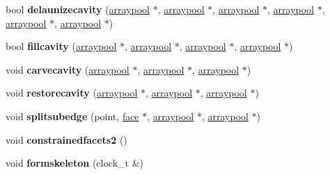 \begin{DoxyCompactItemize}
\item 
\hypertarget{classtetgenmesh_ad8084ebb402b7a0d06303eda20ecae65}{bool {\bfseries delaunizecavity} (\hyperlink{classtetgenmesh_1_1arraypool}{arraypool} $\ast$, \hyperlink{classtetgenmesh_1_1arraypool}{arraypool} $\ast$, \hyperlink{classtetgenmesh_1_1arraypool}{arraypool} $\ast$, \hyperlink{classtetgenmesh_1_1arraypool}{arraypool} $\ast$, \hyperlink{classtetgenmesh_1_1arraypool}{arraypool} $\ast$, \hyperlink{classtetgenmesh_1_1arraypool}{arraypool} $\ast$)}\label{classtetgenmesh_ad8084ebb402b7a0d06303eda20ecae65}

\item 
\hypertarget{classtetgenmesh_a03633c0bdf34efd2fe127d7c07060af8}{bool {\bfseries fillcavity} (\hyperlink{classtetgenmesh_1_1arraypool}{arraypool} $\ast$, \hyperlink{classtetgenmesh_1_1arraypool}{arraypool} $\ast$, \hyperlink{classtetgenmesh_1_1arraypool}{arraypool} $\ast$, \hyperlink{classtetgenmesh_1_1arraypool}{arraypool} $\ast$)}\label{classtetgenmesh_a03633c0bdf34efd2fe127d7c07060af8}

\item 
\hypertarget{classtetgenmesh_a820c230ca5161419ee7d1d9a731a17af}{void {\bfseries carvecavity} (\hyperlink{classtetgenmesh_1_1arraypool}{arraypool} $\ast$, \hyperlink{classtetgenmesh_1_1arraypool}{arraypool} $\ast$, \hyperlink{classtetgenmesh_1_1arraypool}{arraypool} $\ast$)}\label{classtetgenmesh_a820c230ca5161419ee7d1d9a731a17af}

\item 
\hypertarget{classtetgenmesh_aa1697de5ddb0d46c145da0b7da97281c}{void {\bfseries restorecavity} (\hyperlink{classtetgenmesh_1_1arraypool}{arraypool} $\ast$, \hyperlink{classtetgenmesh_1_1arraypool}{arraypool} $\ast$, \hyperlink{classtetgenmesh_1_1arraypool}{arraypool} $\ast$)}\label{classtetgenmesh_aa1697de5ddb0d46c145da0b7da97281c}

\item 
\hypertarget{classtetgenmesh_ae528b2d5d3593a2174877b0f5c0efa99}{void {\bfseries splitsubedge} (point, \hyperlink{classtetgenmesh_1_1face}{face} $\ast$, \hyperlink{classtetgenmesh_1_1arraypool}{arraypool} $\ast$, \hyperlink{classtetgenmesh_1_1arraypool}{arraypool} $\ast$)}\label{classtetgenmesh_ae528b2d5d3593a2174877b0f5c0efa99}

\item 
\hypertarget{classtetgenmesh_a208deaf104d9af7b9c4fe706c2cdbc8f}{void {\bfseries constrainedfacets2} ()}\label{classtetgenmesh_a208deaf104d9af7b9c4fe706c2cdbc8f}

\item 
\hypertarget{classtetgenmesh_a89ab569cf101a8985d35eb1eb8781224}{void {\bfseries formskeleton} (clock\-\_\-t \&)}\label{classtetgenmesh_a89ab569cf101a8985d35eb1eb8781224}


\end{DoxyCompactItemize}
